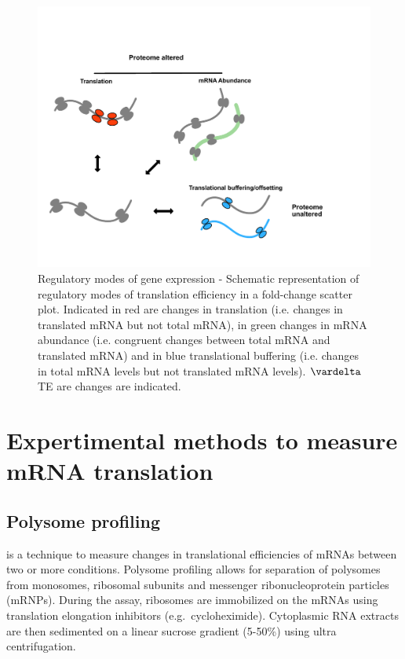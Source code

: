 \documentclass[12pt,openany]{book}
\begin{document}
\begin{figure}
  \includegraphics{./figures/geneModes_MRNA.pdf}
  \caption{Regulatory modes of gene expression - Schematic representation of regulatory modes of translation efficiency in a fold-change scatter plot. Indicated in red are changes in translation (i.e. changes in translated mRNA but not total mRNA), in green changes in mRNA abundance (i.e. congruent changes between total mRNA and translated mRNA) and in blue translational buffering (i.e. changes in total mRNA levels but not translated mRNA levels). \(\vardelta\) TE are changes are indicated.\label{fig:mRNA}}
\end{figure}

\section{Expertimental methods to measure mRNA translation}

\subsection{Polysome profiling}

is a technique to measure changes in translational efficiencies of mRNAs
between two or more conditions. Polysome profiling allows for separation
of polysomes from monosomes, ribosomal subunits and messenger
ribonucleoprotein particles (mRNPs). During the assay, ribosomes are
immobilized on the mRNAs using translation elongation inhibitors
(e.g.~cycloheximide). Cytoplasmic RNA extracts are then sedimented on a
linear sucrose gradient (5-50\%) using ultra centrifugation.
\end{document}
